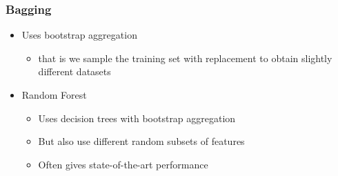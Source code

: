 \documentclass[11pt]{article}
\begin{document}
\subsubsection{Bagging}
\label{sec:org2531cce}
\begin{itemize}
\item Uses bootstrap aggregation
\begin{itemize}
\item that is we sample the training set with replacement to obtain
slightly different datasets
\end{itemize}
\item Random Forest
\begin{itemize}
\item Uses decision trees with bootstrap aggregation
\item But also use different random subsets of features
\item Often gives state-of-the-art performance
\end{itemize}
\end{itemize}
\end{document}
